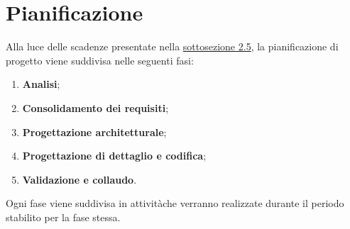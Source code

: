 \section{Pianificazione}
Alla luce delle scadenze presentate nella \hyperlink{scadenze}{sottosezione 2.5}, la pianificazione di progetto viene suddivisa nelle seguenti fasi:
\begin{enumerate}
	\item \textbf{Analisi};
	\item \textbf{Consolidamento dei requisiti};
	\item \textbf{Progettazione architetturale};
	\item \textbf{Progettazione di dettaglio e codifica};
	\item \textbf{Validazione e collaudo}.
\end{enumerate}
Ogni fase viene suddivisa in attività\glosp che verranno realizzate durante il 
periodo stabilito per la fase stessa. 
